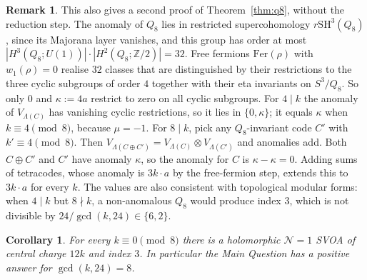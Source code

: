 \documentclass[11pt]{amsart}
\newtheorem{corollary}[theorem]{Corollary}
\theoremstyle{definition}
\newtheorem{remark}[theorem]{Remark}
\begin{document}
\begin{remark}
This also gives a second proof of Theorem~\ref{thm:q8}, without the reduction step. The anomaly of $Q_8$ lies in restricted
supercohomology $r\mathrm{SH}^3(Q_8)$, since its Majorana layer vanishes, and this group has order at most
$|H^3(Q_8;U(1))|\cdot|H^2(Q_8;\mathbb Z/2)|=32$. Free fermions $\mathrm{Fer}(\rho)$ with $w_1(\rho)=0$ realise $32$ classes
that are distinguished by their restrictions to the three cyclic subgroups of order $4$ together with their eta
invariants on $S^3/Q_8$. So only $0$ and $\kappa:=4a$ restrict to zero on all cyclic subgroups. For $4\mid k$ the anomaly
of $V_{\Lambda(C)}$ has vanishing cyclic restrictions, so it lies in $\{0,\kappa\}$; it equals $\kappa$ when
$k\equiv4\pmod8$, because $\mu=-1$. For $8\mid k$, pick any $Q_8$-invariant code $C'$ with $k'\equiv4\pmod8$. Then
$V_{\Lambda(C\oplus C')}=V_{\Lambda(C)}\otimes V_{\Lambda(C')}$ and anomalies add. Both $C\oplus C'$ and $C'$ have
anomaly $\kappa$, so the anomaly for $C$ is $\kappa-\kappa=0$. Adding sums of tetracodes, whose anomaly is $3k\cdot a$
by the free-fermion step, extends this to $3k\cdot a$ for every $k$. The values are also consistent with topological modular forms: when $4\mid k$ but
$8\nmid k$, a non-anomalous $Q_8$ would produce index $3$, which is not divisible by
$24/\gcd(k,24)\in\{6,2\}$.
\end{remark}

\begin{corollary}\label{cor:q8}
For every $k\equiv0\pmod8$ there is a holomorphic $\mathcal N=1$ SVOA of central charge $12k$ and
index $3$. In particular the Main Question has a positive answer for $\gcd(k,24)=8$.
\end{corollary}
\end{document}
